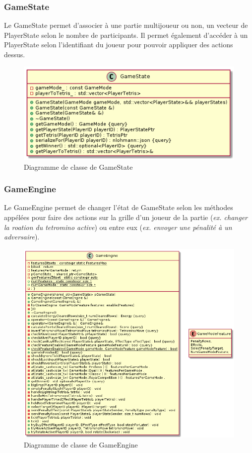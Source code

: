 \documentclass{article}
\begin{document}
\subsubsection*{GameState}

Le GameState permet d'associer à une partie multijoueur ou non, un vecteur de PlayerState selon le nombre de participants. Il permet également d'accéder à un PlayerState selon l'identifiant du joueur pour pouvoir appliquer des actions dessus.

\begin{figure}[!h]
	\centering
	 \includegraphics[scale=0.6]{../res/uml/class/GameStateClass.png}
	 \caption{Diagramme de classe de GameState}
	 \label{fig:GameStateDiagram}
\end{figure}


\subsubsection*{GameEngine}

Le GameEngine permet de changer l'état de GameState selon les méthodes appélées pour faire des actions sur la grille d'un joueur de la partie (\textit{ex. changer la roation du tetromino active}) ou entre eux (\textit{ex. envoyer une pénalité à un adversaire}). 

\begin{figure}[H]
	\centering
	 \includegraphics[scale=0.5]{../res/uml/class/GameEngineClass.png}
	 \caption{Diagramme de classe de GameEngine}
	 \label{fig:GameEngine}
\end{figure}
\end{document}
